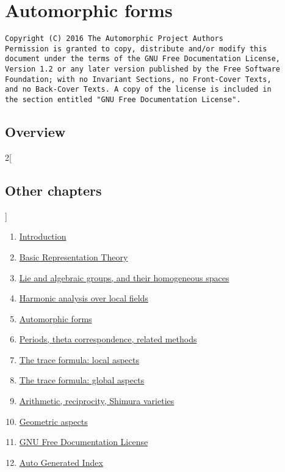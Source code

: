 \documentclass[oneside]{stacks-project-book}
\theoremstyle{plain}
\theoremstyle{definition}
\theoremstyle{remark}
\numberwithin{equation}{subsection}
\begin{document}
%

\chapter{Automorphic forms}



\label{automorphicforms-section-phantom}
\hypertarget{0400}{}
\reversemarginpar{}

\begin{verbatim}
Copyright (C) 2016 The Automorphic Project Authors
Permission is granted to copy, distribute and/or modify this
document under the terms of the GNU Free Documentation License,
Version 1.2 or any later version published by the Free Software
Foundation; with no Invariant Sections, no Front-Cover Texts,
and no Back-Cover Texts. A copy of the license is included in
the section entitled "GNU Free Documentation License".
\end{verbatim}



\section{Overview}
\label{automorphicforms-section-overview}
\hypertarget{0401}{}
\reversemarginpar{}






\begin{multicols}{2}[\section{Other chapters}]
\noindent
\begin{enumerate}
\item \hyperref[introduction-section-phantom]{Introduction}
\item \hyperref[representationtheory-section-phantom]{Basic Representation Theory}
\item \hyperref[algebraicgroups-section-phantom]{Lie and algebraic groups, and their homogeneous spaces}
\item \hyperref[harmonicanalysis-section-phantom]{Harmonic analysis over local fields}
\item \hyperref[automorphicforms-section-phantom]{Automorphic forms}
\item \hyperref[periods-section-phantom]{Periods, theta correspondence, related methods}
\item \hyperref[traceformulalocal-section-phantom]{The trace formula: local aspects}
\item \hyperref[traceformulaglobal-section-phantom]{The trace formula: global aspects}
\item \hyperref[arithmetic-section-phantom]{Arithmetic, reciprocity, Shimura varieties}
\item \hyperref[geometric-section-phantom]{Geometric aspects}
\item \hyperref[fdl-section-phantom]{GNU Free Documentation License}
\item \hyperref[index-section-phantom]{Auto Generated Index}
\end{enumerate}
\end{multicols}
\end{document}

